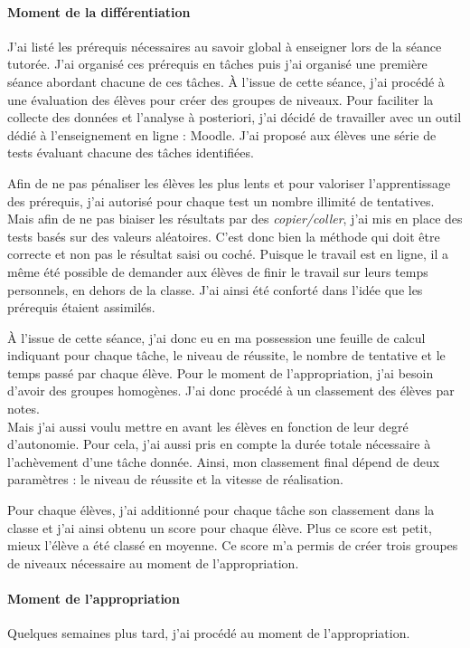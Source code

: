 \paragraph{Moment de la différentiation}
%
J'ai listé les prérequis nécessaires au savoir global à enseigner lors de la séance tutorée. J'ai organisé ces prérequis en tâches puis j'ai organisé une première séance abordant chacune de ces tâches. À l'issue de cette séance, j'ai procédé à une évaluation des élèves pour créer des groupes de niveaux.
%
Pour faciliter la collecte des données et l'analyse à posteriori, j'ai décidé de travailler avec un outil dédié à l'enseignement en ligne : Moodle. J'ai proposé aux élèves une série de tests évaluant chacune des tâches identifiées.

Afin de ne pas pénaliser les élèves les plus lents et pour valoriser l'apprentissage des prérequis, j'ai autorisé pour chaque test un nombre illimité de tentatives. Mais afin de ne pas biaiser les résultats par des \emph{copier/coller}, j'ai mis en place des tests basés sur des valeurs aléatoires. C'est donc bien la méthode qui doit être correcte et non pas le résultat saisi ou coché.
%
Puisque le travail est en ligne, il a même été possible de demander aux élèves de finir le travail sur leurs temps personnels, en dehors de la classe. J'ai ainsi été conforté dans l'idée que les prérequis étaient assimilés.

À l'issue de cette séance, j'ai donc eu en ma possession une feuille de calcul indiquant pour chaque tâche, le niveau de réussite, le nombre de tentative et le temps passé par chaque élève.
%
Pour le moment de l'appropriation, j'ai besoin d'avoir des groupes homogènes. J'ai donc procédé à un classement des élèves par notes.
\\
Mais j'ai aussi voulu mettre en avant les élèves en fonction de leur degré d'autonomie. Pour cela, j'ai aussi pris en compte la durée totale nécessaire à l'achèvement d'une tâche donnée. Ainsi, mon classement final dépend de deux paramètres : le niveau de réussite et la vitesse de réalisation.

Pour chaque élèves, j'ai additionné pour chaque tâche son classement dans la classe et j'ai ainsi obtenu un score pour chaque élève. Plus ce score est petit, mieux l'élève a été classé en moyenne. Ce score m'a permis de créer trois groupes de niveaux nécessaire au moment de l'appropriation.


\paragraph{Moment de l'appropriation}
%
Quelques semaines plus tard, j'ai procédé au moment de l'appropriation. 

